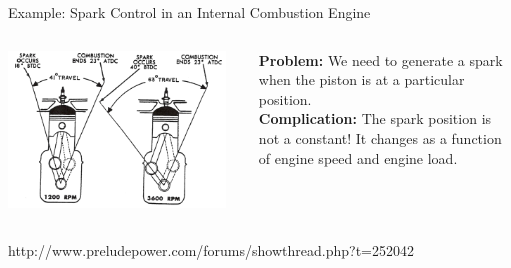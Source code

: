 \documentclass[aspectratio=169]{beamer}
\begin{document}
	
  
	\begin{frame}{Example: Spark Control in an Internal Combustion Engine}
	\vspace{1em}
	\begin{columns}
	\begin{column}{0.6\textwidth}
	\includegraphics[width=0.95\textwidth,keepaspectratio]{img/LeanAdvance.png}
	\end{column}
	\begin{column}{0.4\textwidth}
	\textbf{Problem:} We need to generate a spark when the piston is at a particular position. \\
	\vspace{1em}
	\textbf{Complication:} The spark position is not a constant! It changes as a function of engine speed and engine load.
	\end{column}
	\end{columns}
	\vspace{1em}
	\begin{footnotesize}http://www.preludepower.com/forums/showthread.php?t=252042\end{footnotesize}
	\end{frame}	  
  
  
  
\end{document}
